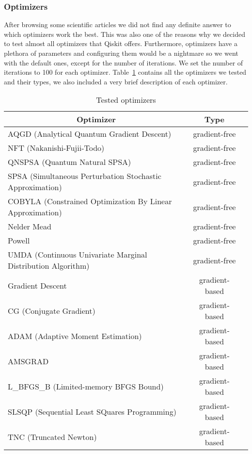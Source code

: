 \subsubsection{Optimizers}
After browsing some scientific articles we did not find any definite answer to which optimizers work the best. This was also one of the reasons why we decided to test almost all optimizers that Qiskit offers. Furthermore, optimizers have a plethora of parameters and configuring them would be a nightmare so we went with the default ones, except for the number of iterations. We set the number of iterations to 100 for each optimizer. Table~\ref{tab:optimizers} contains all the optimizers we tested and their types, we also included a very brief description of each optimizer.

\begin{table}[H]
    \centering
    \caption{Tested optimizers}
    \begin{tabular}{|l|c|c|} 
        \hline
        \multicolumn{1}{|c|}{\textbf{Optimizer}} & \textbf{Type}\\
        \hline
        AQGD (Analytical Quantum Gradient Descent) & gradient-free \\ 
        \hline
        NFT (Nakanishi-Fujii-Todo) & gradient-free \\ 
        \hline
        QNSPSA (Quantum Natural SPSA) & gradient-free \\ 
        \hline
        SPSA (Simultaneous Perturbation Stochastic Approximation) & gradient-free \\ 
        \hline
        COBYLA (Constrained Optimization By Linear Approximation) & gradient-free \\ 
        \hline
        Nelder Mead & gradient-free \\ 
        \hline
        Powell & gradient-free \\ 
        \hline
        UMDA (Continuous Univariate Marginal Distribution Algorithm) & gradient-free \\ 
        \hline
        Gradient Descent & gradient-based \\ 
        \hline
        CG (Conjugate Gradient) & gradient-based \\ 
        \hline
        ADAM (Adaptive Moment Estimation) & gradient-based \\ 
        \hline
        AMSGRAD & gradient-based \\ 
        \hline
        L\_BFGS\_B (Limited-memory BFGS Bound) & gradient-based \\ 
        \hline
        SLSQP (Sequential Least SQuares Programming) & gradient-based \\ 
        \hline
        TNC (Truncated Newton) & gradient-based \\ 
        \hline
    \end{tabular}
    \label{tab:optimizers}
\end{table}
